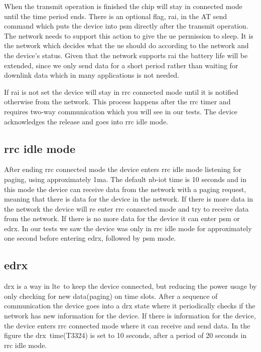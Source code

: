 \documentclass[USenglish]{ifimaster}  %
\begin{document}
When the transmit operation is finished the chip will stay in connected mode until the time period ends. There is an optional flag, \acrfull{rai}, in the AT send command which puts the device into \acrshort{psm} directly after the transmit operation. The network needs to support this action to give the \acrshort{ue} permission to sleep. It is the network which decides what the \acrshort{ue} should do according to the network and the device's status. Given that the network supports \acrshort{rai} the battery life will be extended, since we only send data for a short period rather than waiting for downlink data which in many applications is not needed.

If \acrshort{rai} is not set the device will stay in \acrshort{rrc} connected mode until it is notified otherwise from the network. This process happens after the \acrshort{rrc} timer and requires two-way communication which you will see in our tests. The device acknowledges the release and goes into \acrshort{rrc} idle mode.

\subsection{\acrshort{rrc} idle mode}
After ending \acrshort{rrc} connected mode the device enters \acrshort{rrc} idle mode listening for paging, using approximately 1\acrshort{ma}. The default \acrshort{nb-iot} time is 10 seconds and in this mode the device can receive data from the network with a paging request, meaning that there is data for the device in the network. If there is more data in the network the device will re enter \acrshort{rrc} connected mode and try to receive data from the network. If there is no more data for the device it can enter \acrshort{psm} or \acrshort{edrx}. In our tests we saw the device was only in \acrshort{rrc} idle mode for approximately one second before entering \acrshort{edrx}, followed by \acrshort{psm} mode.

\subsection[\acrlong{edrx}]{\acrfull{edrx}} \label{ssection:edrx}
\acrfull{drx} is a way in \acrshort{lte} to keep the device connected, but reducing the power usage by only checking for new data(paging) on time slots. After a sequence of communication the device goes into a \acrshort{drx} state where it periodically checks if the network has new information for the device. If there is information for the device, the device enters \acrshort{rrc} connected mode where it can receive and send data. In the figure the \acrshort{drx} time(\acrfull{T3324}) is set to 10 seconds, after a period of 20 seconds in \acrshort{rrc} idle mode.
\end{document}
